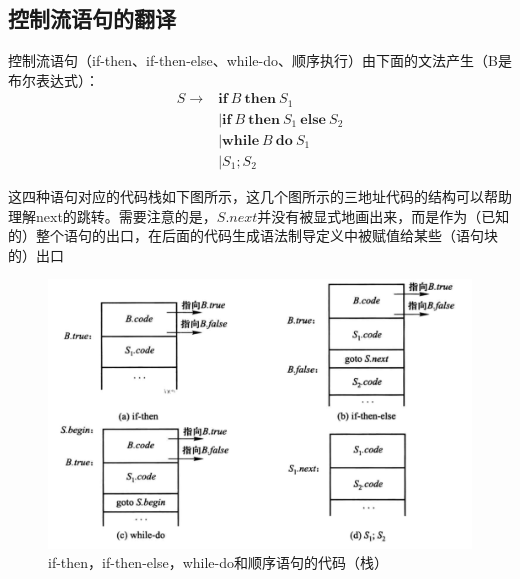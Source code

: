 \documentclass[]{report}
\begin{document}
		\subsection{控制流语句的翻译}
			控制流语句（if-then、if-then-else、while-do、顺序执行）由下面的文法产生（B是布尔表达式）：
			\[\begin{aligned}
				S\to
				&\mathbf{if}\ B\ \mathbf{then}\ S_1\\
				&\mid\mathbf{if}\ B\ \mathbf{then}\ S_1\ \mathbf{else}\ S_2\\
				&\mid\mathbf{while}\ B\ \mathbf{do}\ S_1\\
				&\mid S_1;S_2
			\end{aligned}\]\par
			这四种语句对应的代码栈如下图所示，这几个图所示的三地址代码的结构可以帮助理解next的跳转。需要注意的是，$S.next$并没有被显式地画出来，而是作为（已知的）整个语句的出口，在后面的代码生成语法制导定义中被赋值给某些（语句块的）出口
			\begin{figure}[ht!]
				\centering
				\begin{minipage}{40em}
					\centering
					\includegraphics[scale = 0.4]{images/Bool_Expression_If_Code.png}
					\caption{if-then，if-then-else，while-do和顺序语句的代码（栈）}
				\end{minipage}
			\end{figure}
\end{document}
